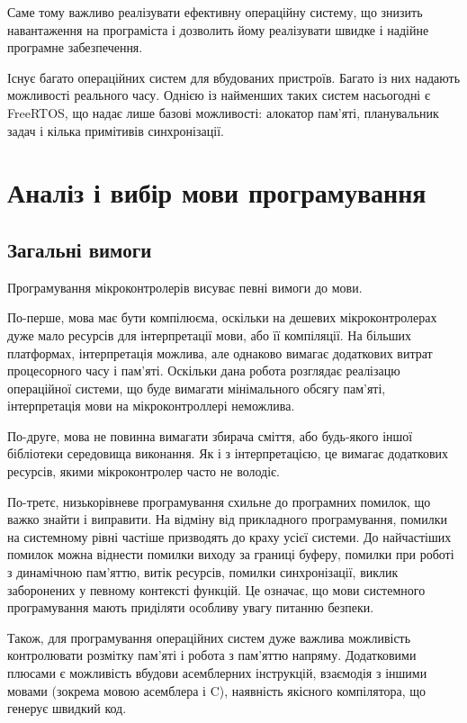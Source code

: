 \documentclass[main.tex]{subfiles}
\begin{document}
Саме тому важливо реалізувати ефективну операційну систему, що знизить навантаження на програміста і дозволить йому реалізувати швидке і надійне програмне забезпечення.

Існує багато операційних систем для вбудованих пристроїв. Багато із них надають можливості реального часу. Однією із найменших таких систем насьогодні є FreeRTOS, що надає лише базові можливості: алокатор пам'яті, планувальник задач і кілька примітивів синхронізації.

\chapter{Аналіз і вибір мови програмування}\label{chap:languages}

\newcommand\LangC{C}

\section{Загальні вимоги}

Програмування мікроконтролерів висуває певні вимоги до мови.

По-перше, мова має бути компілюєма, оскільки на дешевих мікроконтролерах дуже мало ресурсів для інтерпретації мови, або її компіляції. На більших платформах, інтерпретація можлива, але однаково вимагає додаткових витрат процесорного часу і пам'яті. Оскільки дана робота розглядає реалізацю операційної системи, що буде вимагати мінімального обсягу пам'яті, інтерпретація мови на мікроконтроллері неможлива.

По-друге, мова не повинна вимагати збирача сміття, або будь-якого іншої бібліотеки середовища виконання. Як і з інтерпретацією, це вимагає додаткових ресурсів, якими мікроконтролер часто не володіє.

По-третє, низькорівневе програмування схильне до програмних помилок, що важко знайти і виправити. На відміну від прикладного програмування, помилки на системному рівні частіше призводять до краху усієї системи. До найчастіших помилок можна віднести помилки виходу за границі буферу, помилки при роботі з динамічною пам'яттю, витік ресурсів, помилки синхронізації, виклик заборонених у певному контексті функцій. Це означає, що мови системного програмування мають приділяти особливу увагу питанню безпеки.

Також, для програмування операційних систем дуже важлива можливість контролювати розмітку пам'яті і робота з пам'яттю напряму. Додатковими плюсами є можливість вбудови асемблерних інструкцій, взаємодія з іншими мовами (зокрема мовою асемблера і \LangC{}), наявність якісного компілятора, що генерує швидкий код.
\end{document}
